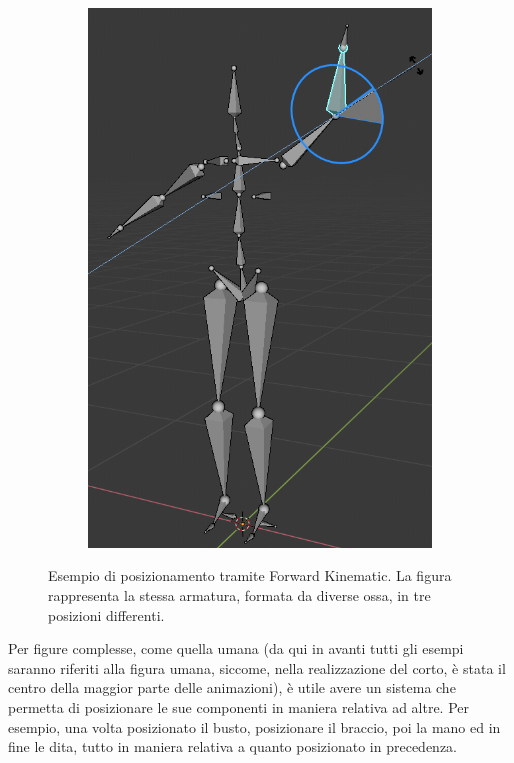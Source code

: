 \begin{figure}
\begin{subfigure}{.33\textwidth}
  \includegraphics[width=\linewidth]{Figures/armature3}
  \label{fig:FK3}
\end{subfigure}
\decoRule
\caption[Cinematica Diretta]{Esempio di posizionamento tramite Forward Kinematic. La figura rappresenta la stessa armatura, formata da diverse ossa, in tre posizioni differenti.}
\label{fig:FK}
\end{figure}

Per figure complesse, come quella umana (da qui in avanti tutti gli esempi saranno riferiti alla figura umana, siccome, nella realizzazione del corto, è stata il centro della maggior parte delle animazioni), è utile avere un sistema che permetta di posizionare le sue componenti in maniera relativa ad altre. Per esempio, una volta posizionato il busto, posizionare il braccio, poi la mano ed in fine le dita, tutto in maniera relativa a quanto posizionato in precedenza.

